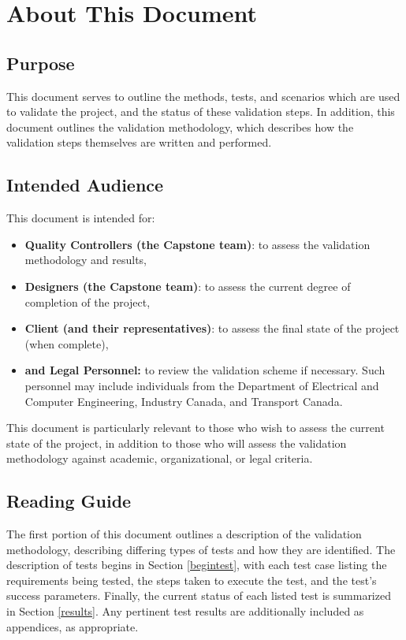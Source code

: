 \documentclass[10pt,letterpaper]{article}
\begin{document}




\section{About This Document}

\subsection{Purpose}
This document serves to outline the methods, tests, and scenarios which are used to validate the project, and the status of these validation steps. In addition, this document outlines the validation methodology, which describes how the validation steps themselves are written and performed.

\subsection{Intended Audience}
This document is intended for:
\begin{itemize}
\item \textbf{Quality Controllers (the Capstone team)}: to assess the validation methodology and results,
\item \textbf{Designers (the Capstone team)}: to assess the current degree of completion of the project,
\item \textbf{Client (and their representatives)}: to assess the final state of the project (when complete),
\item \textbf{and Legal Personnel:} to review the validation scheme if necessary. Such personnel may include individuals from the Department of Electrical and Computer Engineering, Industry Canada, and Transport Canada.
\end{itemize}

This document is particularly relevant to those who wish to assess the current state of the project, in addition to those who will assess the validation methodology against academic, organizational, or legal criteria.

\subsection{Reading Guide}
The first portion of this document outlines a description of the validation methodology, describing differing types of tests and how they are identified. The description of tests begins in Section \ref{begintest}, with each test case listing the requirements being tested, the steps taken to execute the test, and the test's success parameters. Finally, the current status of each listed test is summarized in Section \ref{results}. Any pertinent test results are additionally included as appendices, as appropriate.
\end{document}
